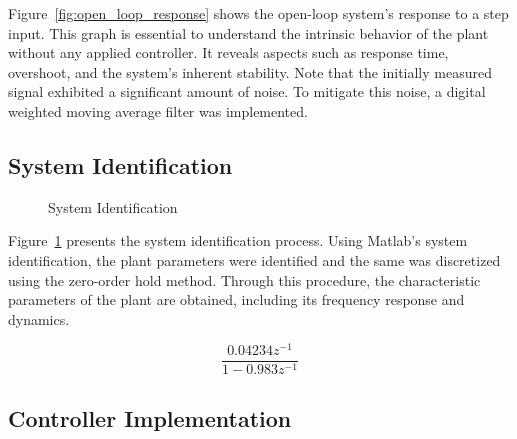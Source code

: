 \documentclass[conference,onecolumn]{IEEEtran}
\begin{document}
Figure~\ref{fig:open_loop_response} shows the open-loop system's response to a step input. This graph is essential to understand the intrinsic behavior of the plant without any applied controller. It reveals aspects such as response time, overshoot, and the system's inherent stability. Note that the initially measured signal exhibited a significant amount of noise. To mitigate this noise, a digital weighted moving average filter was implemented.

\subsection{System Identification}

\begin{figure}[H]
    \centering
    \caption{System Identification}
    \label{fig:sistem_identification}
\end{figure}

Figure~\ref{fig:sistem_identification} presents the system identification process. 
Using Matlab's system identification, the plant parameters were identified and the same was discretized using the zero-order hold method.
Through this procedure, the characteristic parameters of the plant are obtained, including its frequency response and dynamics.

\begin{equation}
\frac{0.04234 z^{-1}}{1 - 0.983 z^{-1}}
\end{equation}


\subsection{Controller Implementation}
\end{document}
